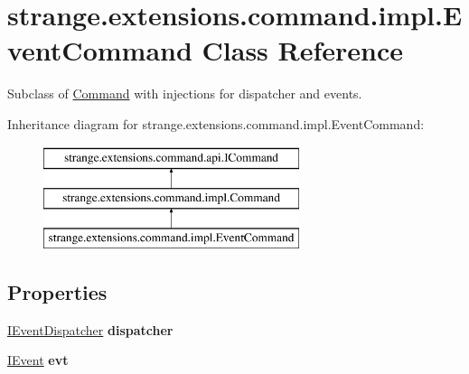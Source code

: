 \hypertarget{classstrange_1_1extensions_1_1command_1_1impl_1_1_event_command}{\section{strange.\-extensions.\-command.\-impl.\-Event\-Command Class Reference}
\label{classstrange_1_1extensions_1_1command_1_1impl_1_1_event_command}
}


Subclass of \hyperlink{classstrange_1_1extensions_1_1command_1_1impl_1_1_command}{Command} with injections for dispatcher and events.  


Inheritance diagram for strange.\-extensions.\-command.\-impl.\-Event\-Command\-:\begin{figure}[H]
\begin{center}
\leavevmode
\includegraphics[height=3.000000cm]{classstrange_1_1extensions_1_1command_1_1impl_1_1_event_command}
\end{center}
\end{figure}
\subsection*{Properties}
\begin{DoxyCompactItemize}
\item 
\hypertarget{classstrange_1_1extensions_1_1command_1_1impl_1_1_event_command_a7636e8b4c3c01ed4f32818fd22d2bd76}{\hyperlink{interfacestrange_1_1extensions_1_1dispatcher_1_1eventdispatcher_1_1api_1_1_i_event_dispatcher}{I\-Event\-Dispatcher} {\bfseries dispatcher}}\label{classstrange_1_1extensions_1_1command_1_1impl_1_1_event_command_a7636e8b4c3c01ed4f32818fd22d2bd76}

\item 
\hypertarget{classstrange_1_1extensions_1_1command_1_1impl_1_1_event_command_a1a2d078ac2c9053cb164bd6eb4e522e8}{\hyperlink{interfacestrange_1_1extensions_1_1dispatcher_1_1eventdispatcher_1_1api_1_1_i_event}{I\-Event} {\bfseries evt}}\label{classstrange_1_1extensions_1_1command_1_1impl_1_1_event_command_a1a2d078ac2c9053cb164bd6eb4e522e8}

\end{DoxyCompactItemize}

